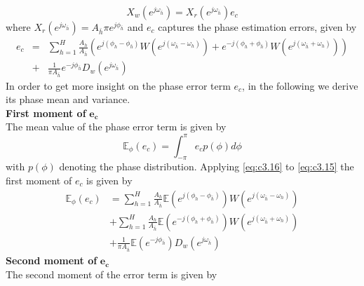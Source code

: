 \begin{equation}\label{eq:c3.14}
X_w(e^{j\omega_{\bar{h}}})=X_r(e^{j\omega_{\bar{h}}})e_c
\end{equation}
where $X_r(e^{j\omega_{\bar{h}}})=A_{\bar{h}}\pi e^{j\phi_{\bar{h}}}$ and $e_c$ captures the phase estimation errors, given by
\begin{eqnarray}\label{eq:c3.15}
e_c&=&\sum_{h=1}^H\frac{A_h}{A_{\bar{h}}}\left( e^{j(\phi_h-\phi_{\bar{h}})}W(e^{j(\omega_{\bar{h}}-\omega_h)})+ e^{-j(\phi_h+\phi_{\bar{h}})}W(e^{j(\omega_{\bar{h}}+\omega_h)}) \right)\nonumber\\
&+& \frac{1}{\pi A_{\bar{h}}}e^{-j\phi_{\bar{h}}}D_w(e^{j\omega_{\bar{h}}})
\end{eqnarray}
In order to get more insight on the phase error term $e_c$, in the following we derive its phase mean and variance.\\
\textbf{First moment of }$\boldsymbol{e_c}$~\\
\noindent The mean value of the phase error term is given by
\begin{equation}\label{eq:c3.16}
\mathbb{E}_\phi(e_c)=\int_{-\pi}^\pi e_c p(\phi)d\phi
\end{equation}
with $p(\phi)$ denoting the phase distribution. Applying \eqref{eq:c3.16} to \eqref{eq:c3.15} the first moment of $e_c$ is given by
\begin{equation}\label{eq:c3.17}
\begin{split}
\mathbb{E}_\phi(e_c) &= \sum_{h=1}^H\frac{A_h}{A_{\bar{h}}} \mathbb{E}(e^{j(\phi_h-\phi_{\bar{h}})})W(e^{j(\omega_{\bar{h}}-\omega_h)})\\
&+ \sum_{h=1}^H\frac{A_h}{A_{\bar{h}}} \mathbb{E}(e^{-j(\phi_h+\phi_{\bar{h}})})W(e^{j(\omega_{\bar{h}}+\omega_h)})\\
&+ \frac{1}{\pi A_{\bar{h}}}\mathbb{E}(e^{-j\phi_{\bar{h}}})D_w(e^{j\omega_{\bar{h}}})
\end{split}
\end{equation}
\textbf{Second moment of }$\boldsymbol{e_c}$~\\
\noindent {}The second moment of the error term is given by
